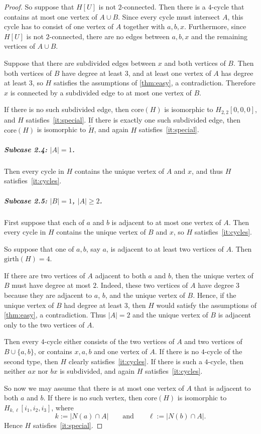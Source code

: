 \documentclass[a4paper,UKenglish,cleveref, autoref, thm-restate]{lipics-v2021}
\newcommand{\girth}{\mathrm{girth}}
\newcommand{\core}{\mathrm{core}}
\begin{document}
\begin{proof}
So suppose that $H[U]$ is not $2$-connected.
Then there is a $4$-cycle that contains at most one vertex of $A\cup B$.
Since every cycle must intersect $A$, this cycle has to consist of one vertex of $A$ together with $a,b,x$.
Furthermore, since $H[U]$ is not $2$-connected, there are no edges between $a,b,x$ and the remaining vertices of $A\cup B$.

Suppose that there are subdivided edges between $x$ and both vertices of $B$.
Then both vertices of $B$ have degree at least $3$, and at least one vertex of $A$ has degree at least $3$, so $H$ satisfies the assumptions of \cref{thm:easy}, a contradiction.
Therefore $x$ is connected by a subdivided edge to at most one vertex of $B$.

If there is no such subdivided edge, then $\core(H)$ is isomorphic to $H_{2,2}[0,0,0]$, and $H$ satisfies~\ref{it:special}.
If there is exactly one such subdivided edge, then $\core(H)$ is isomorphic to $\widetilde{H}$, and again $H$ satisfies~\ref{it:special}.

\subparagraph*{Subcase 2.4: \boldmath $|A|=1$.}
Then every cycle in $H$ contains the unique vertex of $A$ and $x$, and thus $H$ satisfies~\ref{it:cycles}.

\subparagraph*{Subcase 2.5: \boldmath $|B|=1$, $|A|\geq 2$.}
First suppose that each of $a$ and $b$ is adjacent to at most one vertex of $A$.
Then every cycle in $H$ contains the unique vertex of $B$ and $x$, so $H$ satisfies~\ref{it:cycles}.

So suppose that one of $a,b$, say $a$, is adjacent to at least two vertices of $A$.
Then $\girth(H)=4$.

If there are two vertices of $A$ adjacent to both $a$ and $b$, then the unique vertex of $B$ must have degree at most $2$.
Indeed, these two vertices of $A$ have degree $3$ because they are adjacent to $a$, $b$, and the unique vertex of $B$.
Hence, if the unique vertex of $B$ had degree at least $3$, then $H$ would satisfy the assumptions of \cref{thm:easy}, a contradiction.
Thus $|A|=2$ and the unique vertex of $B$ is adjacent only to the two vertices of $A$.

Then every $4$-cycle either consists of the two vertices of $A$ and two vertices of $B\cup\{a,b\}$, or contains $x,a,b$ and one vertex of $A$.
If there is no $4$-cycle of the second type, then $H$ clearly satisfies~\ref{it:cycles}.
If there is such a $4$-cycle, then neither $ax$ nor $bx$ is subdivided, and again $H$ satisfies~\ref{it:cycles}.

So now we may assume that there is at most one vertex of $A$ that is adjacent to both $a$ and $b$.
If there is no such vertex, then $\core(H)$ is isomorphic to $H_{k,\ell}[i_1,i_2,i_3]$, where
\[
k:=|N(a)\cap A|
\qquad\text{and}\qquad
\ell:=|N(b)\cap A|.
\]
Hence $H$ satisfies~\ref{it:special}.


\end{proof}
\end{document}
